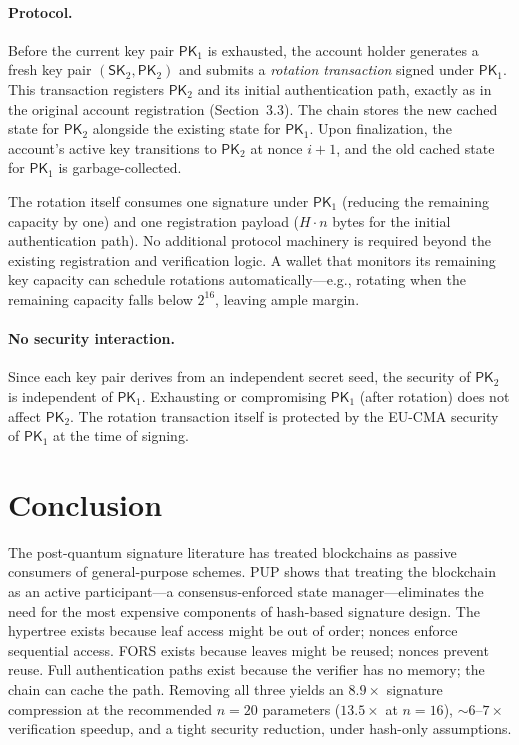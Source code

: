 \documentclass[11pt]{article}
\begin{document}
\paragraph{Protocol.}
Before the current key pair $\mathsf{PK}_1$ is exhausted, the account
holder generates a fresh key pair $(\mathsf{SK}_2, \mathsf{PK}_2)$
and submits a \emph{rotation transaction} signed under $\mathsf{PK}_1$.
This transaction registers $\mathsf{PK}_2$ and its initial
authentication path, exactly as in the original account registration
(Section~3.3). The chain stores the new cached state for
$\mathsf{PK}_2$ alongside the existing state for $\mathsf{PK}_1$.
Upon finalization, the account's active key transitions to
$\mathsf{PK}_2$ at nonce $i + 1$, and the old cached state for
$\mathsf{PK}_1$ is garbage-collected.

The rotation itself consumes one signature under $\mathsf{PK}_1$
(reducing the remaining capacity by one) and one registration payload
($H \cdot n$ bytes for the initial authentication path). No additional
protocol machinery is required beyond the existing registration and
verification logic. A wallet that monitors its remaining key capacity
can schedule rotations automatically---e.g., rotating when the
remaining capacity falls below $2^{16}$, leaving ample margin.

\paragraph{No security interaction.}
Since each key pair derives from an independent secret seed, the
security of $\mathsf{PK}_2$ is independent of $\mathsf{PK}_1$.
Exhausting or compromising $\mathsf{PK}_1$ (after rotation) does not
affect $\mathsf{PK}_2$. The rotation transaction itself is protected
by the EU-CMA security of $\mathsf{PK}_1$ at the time of signing.

\section{Conclusion}

The post-quantum signature literature has treated blockchains as passive
consumers of general-purpose schemes. PUP shows that treating the
blockchain as an active participant---a consensus-enforced state
manager---eliminates the need for the most expensive components of
hash-based signature design. The hypertree exists because leaf access
might be out of order; nonces enforce sequential access. FORS exists
because leaves might be reused; nonces prevent reuse. Full
authentication paths exist because the verifier has no memory; the
chain can cache the path. Removing all three yields an $8.9\times$
signature compression at the recommended $n = 20$ parameters
($13.5\times$ at $n = 16$), ${\sim}6$--$7\times$ verification speedup,
and a tight security reduction, under hash-only assumptions.
\end{document}
